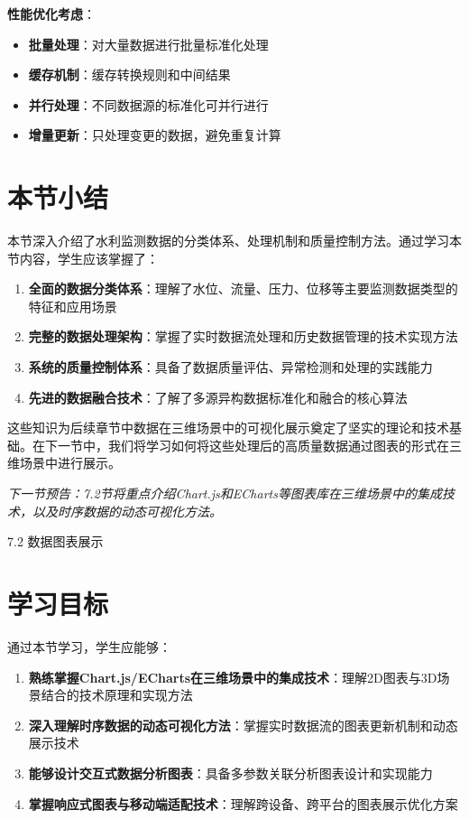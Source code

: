 \textbf{性能优化考虑}：

\begin{itemize}
\tightlist
\item
  \textbf{批量处理}：对大量数据进行批量标准化处理
\item
  \textbf{缓存机制}：缓存转换规则和中间结果
\item
  \textbf{并行处理}：不同数据源的标准化可并行进行
\item
  \textbf{增量更新}：只处理变更的数据，避免重复计算
\end{itemize}

\section{本节小结}

本节深入介绍了水利监测数据的分类体系、处理机制和质量控制方法。通过学习本节内容，学生应该掌握了：

\begin{enumerate}
\def\labelenumi{\arabic{enumi}.}
\tightlist
\item
  \textbf{全面的数据分类体系}：理解了水位、流量、压力、位移等主要监测数据类型的特征和应用场景
\item
  \textbf{完整的数据处理架构}：掌握了实时数据流处理和历史数据管理的技术实现方法
\item
  \textbf{系统的质量控制体系}：具备了数据质量评估、异常检测和处理的实践能力
\item
  \textbf{先进的数据融合技术}：了解了多源异构数据标准化和融合的核心算法
\end{enumerate}

这些知识为后续章节中数据在三维场景中的可视化展示奠定了坚实的理论和技术基础。在下一节中，我们将学习如何将这些处理后的高质量数据通过图表的形式在三维场景中进行展示。

\emph{下一节预告：7.2节将重点介绍Chart.js和ECharts等图表库在三维场景中的集成技术，以及时序数据的动态可视化方法。}

 7.2 数据图表展示

\section{学习目标}

通过本节学习，学生应能够：

\begin{enumerate}
\def\labelenumi{\arabic{enumi}.}
\tightlist
\item
  \textbf{熟练掌握Chart.js/ECharts在三维场景中的集成技术}：理解2D图表与3D场景结合的技术原理和实现方法
\item
  \textbf{深入理解时序数据的动态可视化方法}：掌握实时数据流的图表更新机制和动态展示技术
\item
  \textbf{能够设计交互式数据分析图表}：具备多参数关联分析图表设计和实现能力
\item
  \textbf{掌握响应式图表与移动端适配技术}：理解跨设备、跨平台的图表展示优化方案
\end{enumerate}

